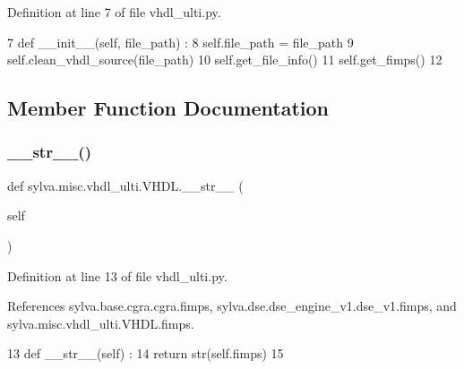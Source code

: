 Definition at line 7 of file vhdl\+\_\+ulti.\+py.


\begin{DoxyCode}
7   \textcolor{keyword}{def }\_\_init\_\_(self, file\_path) :
8     self.file\_path = file\_path
9     self.clean\_vhdl\_source(file\_path)
10     self.get\_file\_info()
11     self.get\_fimps()
12 
\end{DoxyCode}


\subsection{Member Function Documentation}
\mbox{\label{classsylva_1_1misc_1_1vhdl__ulti_1_1_v_h_d_l_a2a6786cbe721ea37e8ada800f5787ba4}} 
\subsubsection{\texorpdfstring{\+\_\+\+\_\+str\+\_\+\+\_\+()}{\_\_str\_\_()}}
{\footnotesize\ttfamily def sylva.\+misc.\+vhdl\+\_\+ulti.\+V\+H\+D\+L.\+\_\+\+\_\+str\+\_\+\+\_\+ (\begin{DoxyParamCaption}\item[{}]{self }\end{DoxyParamCaption})}



Definition at line 13 of file vhdl\+\_\+ulti.\+py.



References sylva.\+base.\+cgra.\+cgra.\+fimps, sylva.\+dse.\+dse\+\_\+engine\+\_\+v1.\+dse\+\_\+v1.\+fimps, and sylva.\+misc.\+vhdl\+\_\+ulti.\+V\+H\+D\+L.\+fimps.


\begin{DoxyCode}
13   \textcolor{keyword}{def }\_\_str\_\_(self) :
14     \textcolor{keywordflow}{return} str(self.fimps)
15 
\end{DoxyCode}
\mbox{\label{classsylva_1_1misc_1_1vhdl__ulti_1_1_v_h_d_l_ad7c048b801d2a2259246cf8d08d37fab}} 
